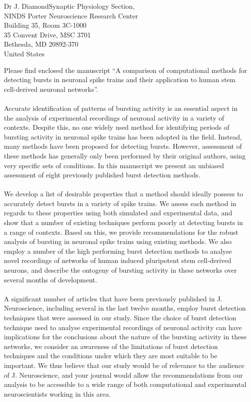 \documentclass[usebwarms,a4paper,nofold]{damtplet}
\begin{document}
\begin{letter}{Dr J. Diamond}{Synaptic Physiology Section, \\ NINDS
Porter Neuroscience Research Center \\
Building 35, Room 3C-1000 \\
35 Convent Drive, MSC 3701  \\
Bethesda, MD 20892-370 \\
United States}
%
%
{

 Please find enclosed the manuscript ``A comparison of computational methods for detecting bursts in neuronal spike trains and their application to human stem cell-derived neuronal networks''. 
 \\ \\Accurate identification of patterns of bursting activity is an essential aspect in the analysis of experimental recordings of neuronal activity in a variety of contexts. Despite this, no one widely used method for identifying periods of bursting activity in neuronal spike trains has been adopted in the field. Instead, many methods have been proposed for detecting bursts. However, assessment of these methods has generally only been performed by their original authors, using very specific sets of conditions. In this manuscript we present an unbiased assessment of eight previously published burst detection methods. 
 \\ \\We develop a list of desirable properties that a method should ideally possess to accurately detect bursts in a variety of spike trains. We assess each method in regards to these properties using both simulated and experimental data, and show that a number of existing techniques perform poorly at detecting bursts in a range of contexts. Based on this, we provide recommendations for the robust analysis of bursting in neuronal spike trains using existing methods. We also employ a number of the high performing burst detection methods to analyse novel recordings of networks of human induced pluripotent stem cell-derived neurons, and describe the ontogeny of bursting activity in these networks over several months of development.
  \\ \\A significant number of articles that have been previously published in J. Neuroscience, including several in the last twelve months, employ burst detection techniques that were assessed in our study. Since the choice of burst detection technique used to analyse experimental recordings of neuronal activity can have implications for the conclusions about the nature of the bursting activity in these networks, we consider an awareness of the limitations of burst detection techniques and the conditions under which they are most suitable to be important. We thus believe that our study would be of relevance to the audience of J. Neuroscience, and your journal would allow the recommendations from our analysis to be accessible to a wide range of both computational and experimental neuroscientists working in this area.
}
\end{letter}
\end{document}
